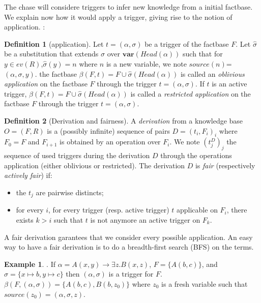 \documentclass{article}
\theoremstyle{definition}
\newtheorem{definition}{Definition}[section]
\newtheorem{example}{Example}[section]
\theoremstyle{remark}
\begin{document}
The chase will considere triggers to infer new knowledge from a initial factbase. We explain now how it would apply a trigger, giving rise to the notion of application. :

\begin{definition}[application]
Let $t = (\alpha,\sigma)$ be a trigger of the factbase $F$. Let $\hat \sigma$ be a substitution that extends $\sigma$ over $\textbf{var}(\textit{Head}(\alpha))$ such that for $y \in \textit{ev}(R)$,$\hat \sigma(y) = n$ where $n$ is a new variable, we note \emph{$\textit{source}(n)$}= $(\alpha,\sigma,y)$.
the factbase $\beta(F,t)=F \cup \hat \sigma(\textit{Head}(\alpha))$ is called an \emph{oblivious application} on the factbase $F$ through the trigger $t = (\alpha,\sigma)$. If $t$ is an active trigger, $\beta(F,t)=F \cup \hat \sigma(\textit{Head}(\alpha))$ is called a \emph{restricted application} on the factbase $F$ through the trigger $t = (\alpha,\sigma)$.
\end{definition}

\begin{definition}[Derivation and fairness]
A \emph{derivation} from a knowledge base $O= (F,R)$ is a (possibly infinite) sequence of pairs $D = (t_i,F_i)_{i}$ where $F_0 = F$ and $F_{i+1}$ is obtained by an operation over $F_i$. We note $(t^D_j)_j$ the sequence of used triggers during the derivation $D$ through the operations application (either oblivious or restricted). The derivation $D$ is \emph{fair} (respectively \emph{actively fair}) if:
\begin{itemize}
\item the $t_j$ are pairwise distincts;
\item for every $i$, for every trigger (resp. active trigger) $t$ applicable on $F_i$, there exists $k > i$ such that $t$ is not anymore an active trigger on $F_k$.
\end{itemize}
\end{definition}

A fair derivation garantees that we consider every possible application. An easy way to have a fair derivation is to do a breadth-first search (BFS) on the terms.

\begin{example}. If $\alpha = A(x,y) \rightarrow \exists z.B(x,z)$, $F = \{A(b,c)\}$, and $\sigma = \{x \mapsto b, y \mapsto c \}$ then $(\alpha,\sigma)$ is a trigger for $F$. $\beta(F,(\alpha,\sigma)) = \{A(b,c),B(b,z_0)\}$ where $z_0$ is a fresh variable such that $\textit{source}(z_0)=(\alpha,\sigma,z)$.
\end{example}
\end{document}
